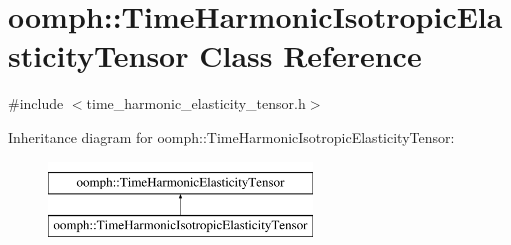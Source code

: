\hypertarget{classoomph_1_1TimeHarmonicIsotropicElasticityTensor}{}\section{oomph\+:\+:Time\+Harmonic\+Isotropic\+Elasticity\+Tensor Class Reference}
\label{classoomph_1_1TimeHarmonicIsotropicElasticityTensor}


{\ttfamily \#include $<$time\+\_\+harmonic\+\_\+elasticity\+\_\+tensor.\+h$>$}

Inheritance diagram for oomph\+:\+:Time\+Harmonic\+Isotropic\+Elasticity\+Tensor\+:\begin{figure}[H]
\begin{center}
\leavevmode
\includegraphics[height=2.000000cm]{classoomph_1_1TimeHarmonicIsotropicElasticityTensor}
\end{center}
\end{figure}
